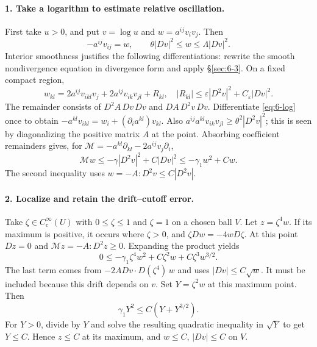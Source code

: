\begin{expandedproof}
\paragraph{1. Take a logarithm to estimate relative oscillation.}
First take $u>0$, and put $v=\log u$ and $w=a^{ij}v_iv_j$.
Then
\begin{equation}\label{eq:6-log}
 -a^{ij}v_{ij}=w,\qquad \theta|Dv|^2\leq w\leq\Lambda|Dv|^2.
\end{equation}
Interior smoothness justifies the following differentiations:
rewrite the smooth nondivergence equation in divergence form and
apply \S\ref{sec:6-3}. On a fixed compact region,
\[
 w_{kl}=2a^{ij}v_{ikl}v_j+2a^{ij}v_{ik}v_{jl}+R_{kl},
 \quad
 |R_{kl}|\leq\varepsilon|D^2v|^2+C_\varepsilon|Dv|^2.
\]
The remainder consists of $D^2A\,Dv\,Dv$ and $DA\,D^2v\,Dv$.
Differentiate \eqref{eq:6-log} once to obtain
$-a^{kl}v_{ikl}=w_i+(\partial_i a^{kl})v_{kl}$.
Also
$a^{ij}a^{kl}v_{ik}v_{jl}\geq\theta^2|D^2v|^2$;
this is seen by diagonalizing the positive matrix $A$ at the point.
Absorbing coefficient remainders gives, for
$\mathcal M=-a^{kl}\partial_{kl}-2a^{ij}v_j\partial_i$,
\[
 \mathcal Mw\leq-\gamma|D^2v|^2+C|Dv|^2
                \leq-\gamma_1w^2+Cw.
\]
The second inequality uses $w= -A:D^2v\leq C|D^2v|$.

\paragraph{2. Localize and retain the drift--cutoff error.}
Take $\zeta\in C^\infty_c(U)$ with $0\leq\zeta\leq1$ and $\zeta=1$
on a chosen ball $V$. Let $z=\zeta^4w$.
If its maximum is positive, it occurs where $\zeta>0$, and
$\zeta Dw=-4wD\zeta$. At this point $Dz=0$ and
$\mathcal Mz=-A:D^2z\geq0$.
Expanding the product yields
\[
 0\leq-\gamma_1\zeta^4w^2+
        C\zeta^2w+C\zeta^3w^{3/2}.
\]
The last term comes from
$-2ADv\cdot D(\zeta^4)\,w$ and uses $|Dv|\leq C\sqrt w$.
It must be included because this drift depends on $v$.
Set $Y=\zeta^2w$ at this maximum point. Then
\[
 \gamma_1Y^2\leq C(Y+Y^{3/2}).
\]
For $Y>0$, divide by $Y$ and solve the resulting quadratic inequality
in $\sqrt Y$ to get $Y\leq C$. Hence $z\leq C$ at its maximum,
and $w\leq C$, $|Dv|\leq C$ on $V$.

\Needspace{45mm}

\end{expandedproof}
